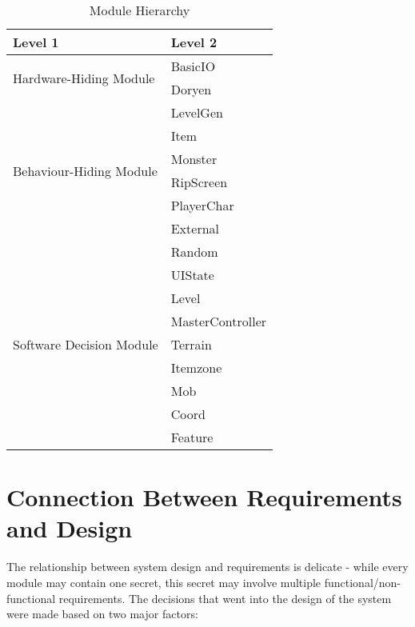 \documentclass[12pt, titlepage]{article}
\newcommand{\newSection}[1]{
  \newpage
  \section{#1}
}
\begin{document}
    \begin{table}[h!]
        \centering
        \begin{tabular}{p{} p{}}
            \toprule
            \textbf{Level 1} & \textbf{Level 2}\\
            \midrule

            \multirow{2}{0.3\textwidth}{Hardware-Hiding Module}
            & BasicIO\\
            & Doryen\\
            \midrule

            \multirow{6}{0.3\textwidth}{Behaviour-Hiding Module}
            & LevelGen\\
            & Item\\
            & Monster\\
            & RipScreen\\
            & PlayerChar\\
            & External\\
            \midrule

            \multirow{9}{0.3\textwidth}{Software Decision Module}
            & Random\\
            & UIState\\
            & Level\\
            & MasterController\\
            & Terrain\\
            & Itemzone\\
            & Mob\\
            & Coord\\
            & Feature\\
            \bottomrule

        \end{tabular}
        \caption{Module Hierarchy}
        \label{TblMH}
    \end{table}

\newSection{Connection Between Requirements and Design} \label{SecConnection}

    
    The relationship between system design and requirements is delicate - while every module may contain one secret, this secret may involve multiple functional/non-functional requirements. The decisions that went into the design of the system were made based on two major factors:
\end{document}
